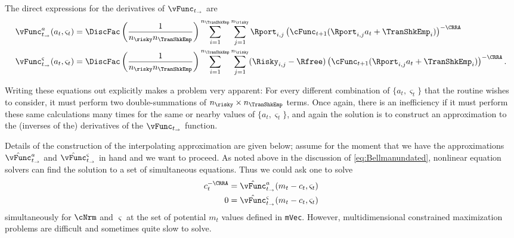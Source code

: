 \documentclass[titlepage, headings=optiontotocandhead]{Resources/texmf-local/tex/latex/econtex}
\begin{document}
The direct expressions for the derivatives of $\vFunc_{t_\rightarrow}$ are
\begin{equation}\begin{gathered}\begin{aligned}
      \vFunc_{t_\rightarrow}^{{a}}({a}_{t},\varsigma_{t})  & = \DiscFac \left(\frac{1}{n_{\risky} n_{\TranShkEmp}}\right)\sum_{i=1}^{n_{\TranShkEmp}}\sum_{j=1}^{n_{\risky} }\Rport_{i,j} \left(\cFunc_{t+1}(\Rport_{i,j}{a}_{t}+\TranShkEmp_{i})\right)^{-\CRRA}
      \\      \vFunc_{t_\rightarrow}^{\varsigma}({a}_{t},\varsigma_{t})  & = \DiscFac \left(\frac{1}{n_{\risky} n_{\TranShkEmp}}\right)\sum_{i=1}^{n_{\TranShkEmp}}\sum_{j=1}^{n_{\risky} }(\Risky_{i,j}-\Rfree)\left(\cFunc_{t+1}(\Rport_{i,j}{a}_{t}+\TranShkEmp_{i})\right)^{-\CRRA}.
    \end{aligned}\end{gathered}\end{equation}

Writing these equations out explicitly makes a problem very apparent: For every different combination of $\{{a}_{t},\varsigma_{t}\}$ that the routine wishes to consider, it must perform two double-summations of $n_{\risky} \times n_{\TranShkEmp}$ terms.  Once again, there is an inefficiency if it must perform these same calculations many times for the same or nearby values of $\{{a}_{t},\varsigma_{t}\}$, and again the solution is to construct an approximation to the (inverses of the) derivatives of the $\vFunc_{t_\rightarrow}$ function.

Details of the construction of the interpolating approximation are given below; assume for the moment that we have the approximations $\hat{\vFunc}_{t_\rightarrow}^{{a}}$ and $\hat{\vFunc}_{t_\rightarrow}^{\varsigma}$ in hand and we want to proceed.  As noted above in the discussion of \eqref{eq:Bellmanundated}, nonlinear equation solvers can find the solution to a set of simultaneous equations.  Thus we could ask one to solve
\begin{equation}\begin{gathered}\begin{aligned}
      {c}_{t}^{-\CRRA}  & = \hat{\vFunc}^{a}_{{t_\rightarrow}}({m}_{t}-{c}_{t},\varsigma_{t}) %
      \\      0  & = \hat{\vFunc}^{\varsigma}_{{t_\rightarrow}}({m}_{t}-{c}_{t},\varsigma_{t}) \label{eq:FOCwrtw}
    \end{aligned}\end{gathered}\end{equation}
simultaneously for $\cNrm$ and $\varsigma$ at the set of potential ${m}_{t}$ values defined in {\texttt{mVec}}. However, multidimensional constrained
maximization problems are difficult and sometimes quite slow to
solve.
\end{document}
